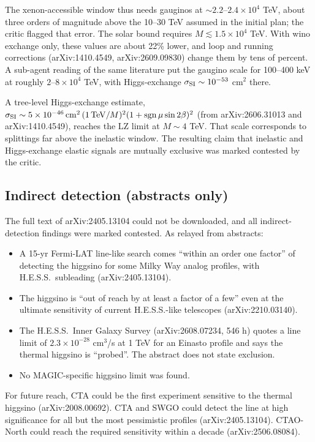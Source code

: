 \documentclass[11pt,a4paper]{article}
\begin{document}
The xenon-accessible window thus needs gauginos at $\sim2.2$--$2.4\times10^4$ TeV, about three orders of magnitude above the 10--30 TeV assumed in the initial plan; the critic flagged that error. The solar bound requires $M\lesssim1.5\times10^4$ TeV. With wino exchange only, these values are about 22\% lower, and loop and running corrections (arXiv:1410.4549, arXiv:2609.09830) change them by tens of percent. A sub-agent reading of the same literature put the gaugino scale for 100--400 keV at roughly $2$--$8\times10^4$ TeV, with Higgs-exchange $\sigma_{\rm SI}\sim10^{-53}$ cm$^2$ there.

A tree-level Higgs-exchange estimate, $\sigma_{\rm SI}\sim5\times10^{-46}\,\mathrm{cm^2}\,(1\,\mathrm{TeV}/M)^2(1+\mathrm{sgn}\,\mu\sin2\beta)^2$ (from arXiv:2606.31013 and arXiv:1410.4549), reaches the LZ limit at $M\sim4$ TeV. That scale corresponds to splittings far above the inelastic window. The resulting claim that inelastic and Higgs-exchange elastic signals are mutually exclusive was marked contested by the critic.

\subsection{Indirect detection (abstracts only)}
The full text of arXiv:2405.13104 could not be downloaded, and all indirect-detection findings were marked contested. As relayed from abstracts:
\begin{itemize}
\item A 15-yr Fermi-LAT line-like search comes ``within an order one factor'' of detecting the higgsino for some Milky Way analog profiles, with H.E.S.S.\ subleading (arXiv:2405.13104).
\item The higgsino is ``out of reach by at least a factor of a few'' even at the ultimate sensitivity of current H.E.S.S.-like telescopes (arXiv:2210.03140).
\item The H.E.S.S.\ Inner Galaxy Survey (arXiv:2608.07234, 546 h) quotes a line limit of $2.3\times10^{-28}$ cm$^3$/s at 1 TeV for an Einasto profile and says the thermal higgsino is ``probed''. The abstract does not state exclusion.
\item No MAGIC-specific higgsino limit was found.
\end{itemize}
For future reach, CTA could be the first experiment sensitive to the thermal higgsino (arXiv:2008.00692). CTA and SWGO could detect the line at high significance for all but the most pessimistic profiles (arXiv:2405.13104). CTAO-North could reach the required sensitivity within a decade (arXiv:2506.08084).
\end{document}
